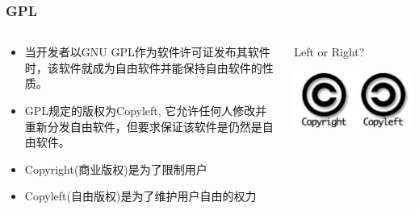 \documentclass[xcolor=svgnames,bigger,presentation]{beamer}
\begin{document}
\begin{frame}
\frametitle{GPL}
\label{sec-2-2-5}
\begin{columns}
\begin{column}{0.6\textwidth}
\label{sec-2-2-5-1}
\begin{itemize}

\item 当开发者以GNU GPL作为软件许可证发布其软件时，该软件就成为自由软件并能保持自由软件的性质。
\label{sec-2-2-5-2}%

\item GPL规定的版权为Copyleft, 它允许任何人修改并重新分发自由软件，但要求保证该软件是仍然是自由软件。
\label{sec-2-2-5-3}%

\item Copyright(商业版权)是为了限制用户
\label{sec-2-2-5-4}%

\item Copyleft(自由版权)是为了维护用户自由的权力
\label{sec-2-2-5-5}%
\end{itemize} %
\end{column}
\begin{column}{0.4\textwidth}
\begin{exampleblock}{Left or Right?}
\label{sec-2-2-5-6}

\includegraphics[width=1\textwidth]{img/copy.jpg}
\end{exampleblock}
\end{column}
\end{columns}
\end{frame}
\end{document}
